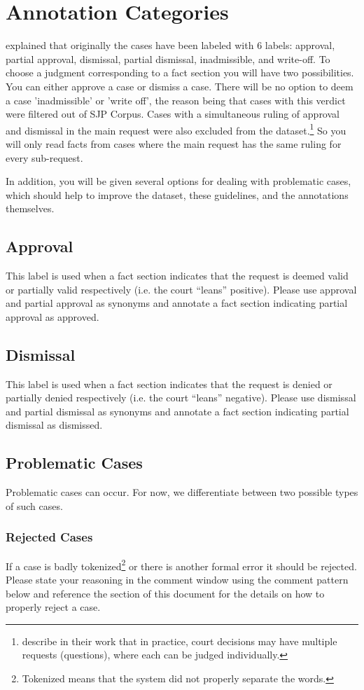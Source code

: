 \documentclass{article}
\begin{document}
\section{Annotation Categories}
\cite{Niklaus_2021} explained that originally the cases have been labeled with 6 labels: approval, partial approval, dismissal, partial dismissal, inadmissible, and write-off. To choose a judgment corresponding to a fact section you will have two possibilities. You can either approve a case or dismiss a case. There will be no option to deem a case 'inadmissible' or 'write off', the reason being that cases with this verdict were filtered out of SJP Corpus. Cases with a simultaneous ruling of approval and dismissal in the main request were also excluded from the dataset.\footnote{\cite{Niklaus_2021} describe in their work that in practice, court decisions may have multiple requests (questions), where each can be judged individually. } So you will only read facts from cases where the main request has the same ruling for every sub-request.

In addition, you will be given several options for dealing with problematic cases, which should help to improve the dataset, these guidelines, and the annotations themselves.
\subsection{Approval}
This label is used when a fact section indicates that the request is deemed valid or partially valid respectively (i.e. the court “leans” positive). Please use approval and partial approval as synonyms and annotate a fact section indicating partial approval as approved.

\subsection{Dismissal}
This label is used when a fact section indicates that the request is denied or partially denied respectively (i.e. the court “leans” negative). Please use dismissal and partial dismissal as synonyms and annotate a fact section indicating partial dismissal as dismissed.
\subsection{Problematic Cases}
Problematic cases can occur. For now, we differentiate between two possible types of such cases.

\subsubsection{Rejected Cases}
If a case is badly tokenized\footnote{Tokenized means that the system did not properly separate the words.} or there is another formal error it should be rejected. Please state your reasoning in the comment window using the comment pattern below and reference the  section of this document for the details on how to properly reject a case. 
\end{document}
